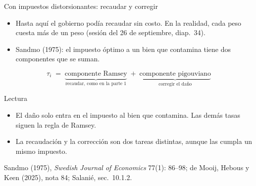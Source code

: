 \documentclass[aspectratio=169,11pt]{beamer}
\newcommand{\fuente}[1]{\par\vfill{\small\color{cGris}#1\par}}
\begin{document}
\begin{frame}{Con impuestos distorsionantes: recaudar y corregir}
  \begin{itemize}
    \item Hasta aquí el gobierno podía recaudar sin costo. En la realidad, cada peso cuesta más de un peso (sesión del 26 de septiembre, diap.~34).
    \pause
    \item Sandmo (1975): el impuesto óptimo a un bien que contamina tiene dos componentes que se suman.
  \end{itemize}
  \pause
  \[
    \tau_i \;=\; \underbrace{\text{componente Ramsey}}_{\text{recaudar, como en la parte 1}} \;+\; \underbrace{\text{componente pigouviano}}_{\text{corregir el daño}}
  \]
  \pause
  \begin{block}{Lectura}
    \begin{itemize}
      \item El daño solo entra en el impuesto al bien que contamina. Las demás tasas siguen la regla de Ramsey.
      \item La recaudación y la corrección son dos tareas distintas, aunque las cumpla un mismo impuesto.
    \end{itemize}
  \end{block}
  \fuente{Sandmo (1975), \emph{Swedish Journal of Economics} 77(1): 86--98; de Mooij, Hebous y Keen (2025), nota 84; Salanié, sec.~10.1.2.}
\end{frame}
\end{document}
